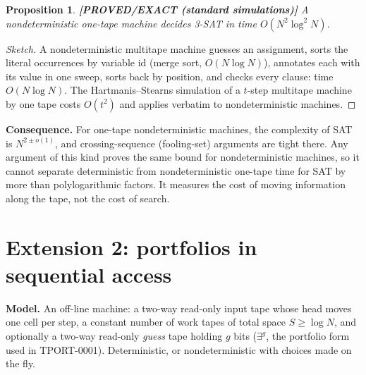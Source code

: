 \documentclass[11pt]{article}
\newtheorem{proposition}[theorem]{Proposition}
\theoremstyle{remark}
\newcommand{\status}[1]{\textbf{[#1]}}
\begin{document}
\begin{proposition}\label{prop:ntime} \status{PROVED/EXACT (standard simulations)}
A nondeterministic one-tape machine decides 3-SAT in time $O(N^2\log^2N)$.
\end{proposition}
\begin{proof}[Sketch]
A nondeterministic multitape machine guesses an assignment, sorts the literal occurrences by variable id
(merge sort, $O(N\log N)$), annotates each with its value in one sweep, sorts back by position, and checks
every clause: time $O(N\log N)$. The Hartmanis--Stearns simulation of a $t$-step multitape machine by one
tape costs $O(t^2)$ and applies verbatim to nondeterministic machines.
\end{proof}

\noindent\textbf{Consequence.} For one-tape nondeterministic machines, the complexity of SAT is
$N^{2\pm o(1)}$, and crossing-sequence (fooling-set) arguments are tight there. Any argument of this kind
proves the same bound for nondeterministic machines, so it cannot separate deterministic from
nondeterministic one-tape time for SAT by more than polylogarithmic factors. It measures the cost of moving
information along the tape, not the cost of search.

\section{Extension 2: portfolios in sequential access}

\noindent\textbf{Model.} An off-line machine: a two-way read-only input tape whose head moves one cell per
step, a constant number of work tapes of total space $S\ge\log N$, and optionally a two-way read-only
\emph{guess} tape holding $g$ bits ($\exists^{g}$, the portfolio form used in TPORT-0001). Deterministic, or
nondeterministic with choices made on the fly.
\end{document}
